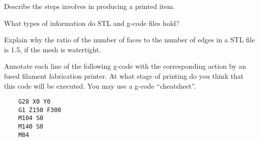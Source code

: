 \documentclass{article}
\begin{document}
\begin{questions}
\item Describe the steps involves in producing a printed item. 
\item What types of information do STL and g-code files hold? 
\item Explain why the ratio of the number of faces to the number of edges in a STL file is 1.5, if the mesh is watertight. 
\item Annotate each line of the following g-code with the corresponding action by an fused filament fabrication printer. At what stage of printing do you think that this code will be executed. You may use a g-code ``cheatsheet''. 
\begin{verbatim}
	G28 X0 Y0  
	G1 Z150 F300
	M104 S0 
	M140 S0 
	M84 
\end{verbatim}
\end{questions}

% 
\end{document}
